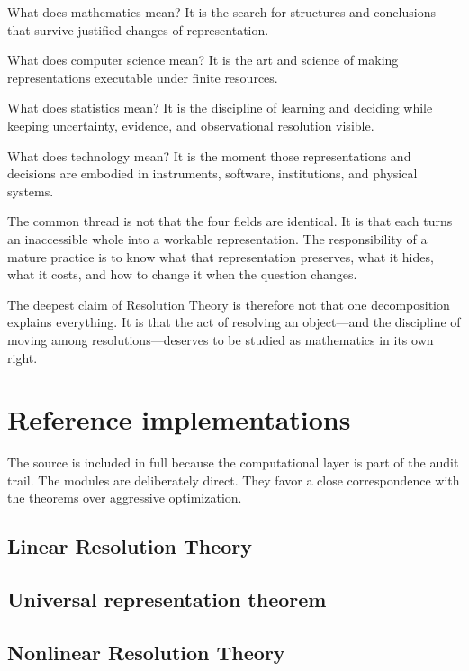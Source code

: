 \documentclass[11pt]{article}
\theoremstyle{definition}
\theoremstyle{remark}
\begin{document}
What does mathematics mean?  It is the search for structures and conclusions that survive justified changes of representation.

What does computer science mean?  It is the art and science of making representations executable under finite resources.

What does statistics mean?  It is the discipline of learning and deciding while keeping uncertainty, evidence, and observational resolution visible.

What does technology mean?  It is the moment those representations and decisions are embodied in instruments, software, institutions, and physical systems.

The common thread is not that the four fields are identical.  It is that each turns an inaccessible whole into a workable representation.  The responsibility of a mature practice is to know what that representation preserves, what it hides, what it costs, and how to change it when the question changes.

The deepest claim of Resolution Theory is therefore not that one decomposition explains everything.  It is that the act of resolving an object---and the discipline of moving among resolutions---deserves to be studied as mathematics in its own right.
\clearpage
\section{Reference implementations}
\label{sec:resolution-reference-code}

The source is included in full because the computational layer is part of the audit trail.  The modules are deliberately direct.  They favor a close correspondence with the theorems over aggressive optimization.

\subsection{Linear Resolution Theory}


\clearpage
\subsection{Universal representation theorem}


\clearpage
\subsection{Nonlinear Resolution Theory}

\end{document}
